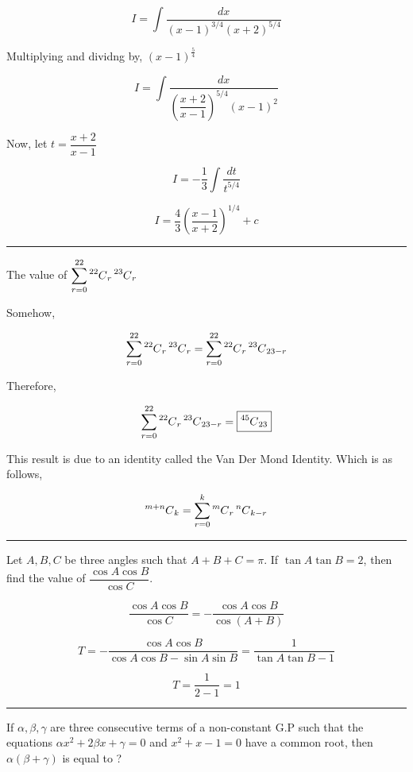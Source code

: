 \documentclass[twocolumn]{article}
\newcommand\Mycomb[2]{\prescript{#1\mkern-0.5mu}{}C_{#2}}
\begin{document}
\[
    I = \int \frac{dx}{(x-1)^{3/4} (x+2)^{5/4} }
\]

Multiplying and dividng by, \((x-1)^\frac{5}{4}\)

\[
    I = \int \frac{dx}{(\dfrac{x+2}{x-1})^{5/4} (x-1)^{2} }
\]

Now, let \(t = \dfrac{x+2}{x-1}\) 

\[
    I = -\frac{1}{3}\int \frac{dt}{t^{5/4} }
\]

\[
    \boxed{I = \frac{4}{3} (\frac{x-1}{x+2})^{1/4} + c }
\]

\hrule 

\begin{question}
    The value of \(\displaystyle \sum_{r = 0}^{22} \Mycomb{22}{r} \Mycomb{23}{r} \) 
\end{question}

Somehow, 

\[
    \sum_{r=0}^{22} \Mycomb{22}{r} \Mycomb{23}{r} = \sum_{r=0} ^{22} \Mycomb{22}{r} \Mycomb{23}{23-r} 
\]

Therefore, 

\[
    \sum_{r=0} ^{22} \Mycomb{22}{r} \Mycomb{23}{23-r} = \boxed{\Mycomb{45}{23}}
\]

This result is due to an identity called the Van Der Mond Identity. Which is as follows, 

\[
    \Mycomb{m+n}{k} = \sum_{r=0} ^{k} \Mycomb{m}{r} \Mycomb{n}{k-r}  
\]

\vspace{0.1in}

\hrule

\begin{question}
    Let \(A, B, C\) be three angles such that \(A + B + C = \pi\). If \(\tan A \tan B = 2\), then find the value of \(\dfrac{\cos A \cos B}{\cos C}\).   
\end{question}

\[
    \frac{\cos A \cos B}{\cos C} = - \frac{\cos A \cos B}{\cos (A + B)}
\]

\[
    T = -\frac{\cos A \cos B}{\cos A \cos B - \sin A \sin B} = \frac{1}{\tan A \tan B -1}
\]

\[
    T = \frac{1}{2-1} = 1 
\]

\hrule

\begin{question}
    If \(\alpha, \beta, \gamma\) are three consecutive terms of a non-constant G.P such that the equations \(\alpha x^{2} + 2\beta x + \gamma = 0\) and \(x^{2} + x -1 = 0\) have a common root, then \(\alpha (\beta+ \gamma)\) is equal to ?    
\end{question}
\end{document}
